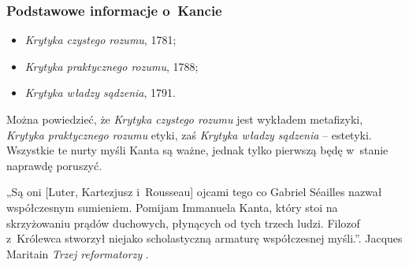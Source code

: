 \documentclass[10pt,t]{beamer}
\begin{document}
\begin{frame}
  \frametitle{Podstawowe informacje o~Kancie}


  \begin{itemize}
    \RaggedRight

  \item \textit{Krytyka czystego rozumu}, 1781;

  \item \textit{Krytyka praktycznego rozumu}, 1788;

  \item \textit{Krytyka władzy sądzenia}, 1791.

  \end{itemize}

  Można powiedzieć, że \textit{Krytyka czystego rozumu} jest wykładem
  metafizyki, \textit{Krytyka praktycznego rozumu} etyki, zaś
  \textit{Krytyka władzy sądzenia} -- estetyki. Wszystkie te nurty
  myśli Kanta są ważne, jednak tylko pierwszą będę w~stanie naprawdę
  poruszyć.

  „Są oni [Luter, Kartezjusz i~Rousseau] ojcami tego co Gabriel
  S\'{e}ailles nazwał współczesnym sumieniem. Pomijam Immanuela Kanta,
  który stoi na skrzyżowaniu prądów duchowych, płynących od tych
  trzech ludzi. Filozof z~Królewca stworzył niejako scholastyczną
  armaturę współczesnej myśli.”. Jacques Maritain \textit{Trzej
    reformatorzy} \cite{}.

\end{frame}
\end{document}
